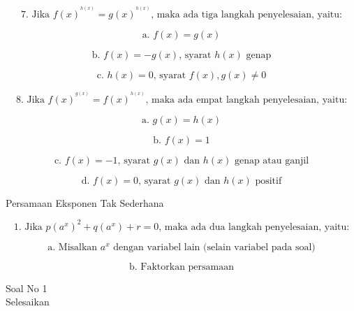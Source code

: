 \begin{eulernotebook}
\begin{eulercomment}
\begin{eulercomment}
\begin{eulercomment}
\end{eulercomment}
\begin{eulerformula}
\[
\text{7. Jika } f(x)^{^{h(x)}} = g(x)^{^{h(x)}} \text{, maka ada tiga langkah penyelesaian, yaitu:}
\]
\end{eulerformula}
\begin{eulerformula}
\[
\text{a. }f(x)=g(x)
\]
\end{eulerformula}
\begin{eulerformula}
\[
\text{b. }f(x)=-g(x) \text{, syarat } h(x) \text{ genap}
\]
\end{eulerformula}
\begin{eulerformula}
\[
\text{c. }h(x)=0 \text{, syarat } f(x),g(x) \neq 0
\]
\end{eulerformula}
\begin{eulercomment}
\end{eulercomment}
\begin{eulerformula}
\[
\text{8. Jika } f(x)^{^{g(x)}} = f(x)^{^{h(x)}} \text{, maka ada empat langkah penyelesaian, yaitu:}
\]
\end{eulerformula}
\begin{eulerformula}
\[
\text{a. }g(x)=h(x)
\]
\end{eulerformula}
\begin{eulerformula}
\[
\text{b. }f(x)=1
\]
\end{eulerformula}
\begin{eulerformula}
\[
\text{c. }f(x)=-1 \text{, syarat } g(x) \text{ dan } h(x) \text{ genap atau ganjil}
\]
\end{eulerformula}
\begin{eulerformula}
\[
\text{d. }f(x)=0 \text{, syarat } g(x) \text{ dan } h(x) \text{ positif}
\]
\end{eulerformula}
\begin{eulercomment}
Persamaan Eksponen Tak Sederhana

\end{eulercomment}
\begin{eulerformula}
\[
\text{1. Jika } p(a^x)^2+q(a^x)+r=0 \text{, maka ada dua langkah penyelesaian, yaitu:}
\]
\end{eulerformula}
\begin{eulerformula}
\[
\text{a. Misalkan } a^x \text{ dengan variabel lain (selain variabel pada soal)}
\]
\end{eulerformula}
\begin{eulerformula}
\[
\text{b. Faktorkan persamaan}
\]
\end{eulerformula}
\begin{eulercomment}
\end{eulercomment}
\begin{eulercomment}
Soal No 1\\
Selesaikan


\end{eulercomment}
\end{eulercomment}
\end{eulercomment}
\end{eulernotebook}
